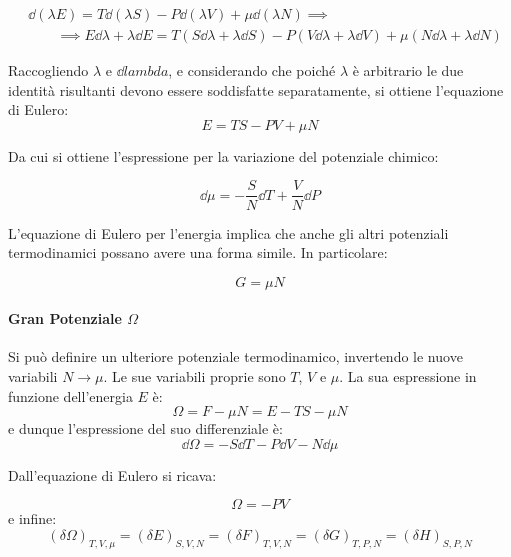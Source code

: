 \begin{align*}
& \dd (\lambda E) = T \dd (\lambda S) - P \dd (\lambda V) + \mu \dd (\lambda N) \implies\\ 
& \qquad \implies E \dd \lambda + \lambda \dd E  = T (S \dd \lambda + \lambda \dd S) - P (V \dd \lambda + \lambda \dd V) + \mu (N\dd \lambda + \lambda \dd N)
\end{align*}

Raccogliendo $\lambda$ e $\dd lambda$, e considerando che poiché $\lambda$ è arbitrario le due identità risultanti devono essere soddisfatte separatamente, si ottiene l'equazione di Eulero:
\begin{equation*}
E = TS - PV + \mu N
\end{equation*}

Da cui si ottiene l'espressione per la variazione del potenziale chimico:

\begin{equation*}
\dd \mu = - \frac{S}{N} \dd T + \frac{V}{N} \dd P
\end{equation*}

L'equazione di Eulero per l'energia implica che anche gli altri potenziali termodinamici possano avere una forma simile. In particolare:

\begin{equation*}
G = \mu N
\end{equation*}

\paragraph{Gran Potenziale $\Omega$} Si può definire un ulteriore potenziale termodinamico, invertendo le nuove variabili $N \rightarrow \mu$. Le sue variabili proprie sono $T$, $V$ e $\mu$. La sua espressione in funzione dell'energia $E$ è:
\begin{equation*}
\Omega = F - \mu N = E - TS - \mu N
\end{equation*}
e dunque l'espressione del suo differenziale è:
\begin{equation*}
\dd \Omega = - S \dd T - P \dd V - N \dd \mu
\end{equation*}

Dall'equazione di Eulero si ricava:

\begin{equation*}
\Omega = - P V
\end{equation*}
e infine:
\begin{equation*}
(\delta \Omega)_{T, V, \mu} = (\delta E)_{S, V, N} = (\delta F)_{T,V,N} = (\delta G)_{T,P,N} = (\delta H)_{S,P,N}
\end{equation*}


